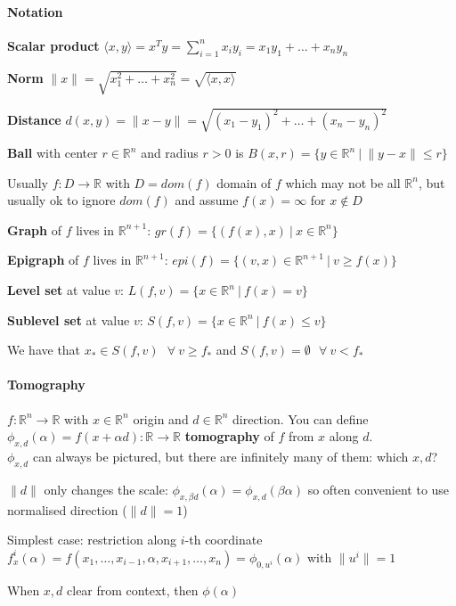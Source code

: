 \documentclass[10pt]{report}
\begin{document}
\paragraph{Notation}\begin{list}{}{}
	\item \textbf{Scalar product} $\langle x,y\rangle = x^Ty = \sum_{i=1}^n x_iy_i = x_1y_1+\ldots+x_ny_n$
	\item \textbf{Norm} $\|x\| = \sqrt{x_1^2+\ldots+x_n^2} = \sqrt{\langle x,x\rangle}$
	\item \textbf{Distance} $d(x,y) = \|x-y\| = \sqrt{(x_1-y_1)^2+\ldots+(x_n-y_n)^2}$
	\item \textbf{Ball} with center $r\in \mathbb{R}^n$ and radius $r > 0$ is $B(x,r) = \{y\in \mathbb{R}^n\:|\:\|y-x\|\leq r\}$
\end{list}
Usually $f:D\rightarrow \mathbb{R}$ with $D = dom(f)$ domain of $f$ which may not be all $\mathbb{R}^n$, but usually ok to ignore $dom(f)$ and assume $f(x)=\infty$ for $x\not\in D$
\begin{list}{}{}
	\item \textbf{Graph} of $f$ lives in $\mathbb{R}^{n+1}$: $gr(f) = \{(f(x),x)\:|\:x\in \mathbb{R}^n\}$
	\item \textbf{Epigraph} of $f$ lives in $\mathbb{R}^{n+1}$: $epi(f)=\{(v,x) \in \mathbb{R}^{n+1}\:|\:v\geq f(x)\}$
	\item \textbf{Level set} at value $v$: $L(f,v)=\{x\in \mathbb{R}^n\:|\:f(x)=v\}$
	\item \textbf{Sublevel set} at value $v$: $S(f,v)=\{x\in \mathbb{R}^n\:|\:f(x)\leq v\}$
\end{list}
We have that $x_* \in S(f,v)\:\:\:\forall\:v\geq f_*$ and $S(f,v) = \emptyset\:\:\:\forall\:v<f_*$

\paragraph{Tomography} $f:\mathbb{R}^n \rightarrow \mathbb{R}$ with $x\in \mathbb{R}^n$ origin and $d\in \mathbb{R}^n$ direction. You can define $\phi_{x,d}(\alpha) = f(x + \alpha d): \mathbb{R} \rightarrow \mathbb{R}$ \textbf{tomography} of $f$ from $x$ along $d$.\\
$\phi_{x,d}$ can always be pictured, but there are infinitely many of them: which $x,d$?\begin{list}{}{}
	\item $\|d\|$ only changes the scale: $\phi_{x,\beta d}(\alpha) = \phi_{x,d}(\beta \alpha)$ so often convenient to use normalised direction ($\|d\| = 1$)
	\item Simplest case: restriction along $i$-th coordinate\\
	$f_x^i(\alpha) = f(x_1,\ldots,x_{i-1},\alpha,x_{i+1},\ldots,x_n) = \phi_{0,u^i}(\alpha)$ with $\|u^i\| = 1$
	\item When $x,d$ clear from context, then $\phi(\alpha)$
\end{list}
\end{document}
